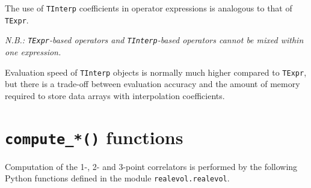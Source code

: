 \documentclass[]{article}
\begin{document}
The use of \texttt{TInterp} coefficients in operator expressions is analogous
to that of \texttt{TExpr}.

\textit{N.B.: \texttt{TExpr}-based operators and \texttt{TInterp}-based 
operators cannot be mixed within one expression.}

Evaluation speed of \texttt{TInterp} objects is normally much higher 
compared to \texttt{TExpr}, but there is a trade-off between evaluation 
accuracy and the amount of memory required to store data arrays with interpolation coefficients.

\section{\label{sec:compute}\texttt{compute\_*()} functions}

Computation of the 1-, 2- and 3-point correlators is performed by the following Python functions defined in the module \texttt{realevol.realevol}.
\end{document}
